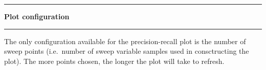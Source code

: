\noindent\rule{\textwidth}{1pt}
\indent \textbf{Plot configuration}
\noindent\rule{\textwidth}{1pt}
\smallskip
\parbox{\textwidth}{The only configuration available for the precision-recall plot is the number of sweep points (i.e.\ number of sweep variable samples used in consctructing the plot). The more points chosen, the longer the plot will take to refresh.}
